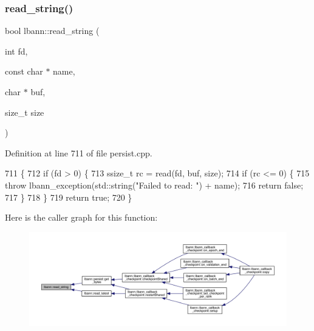 \mbox{\label{namespacelbann_a784843ebce0e596dba31c1d981a7f087}} 
\subsubsection{\texorpdfstring{read\+\_\+string()}{read\_string()}}
{\footnotesize\ttfamily bool lbann\+::read\+\_\+string (\begin{DoxyParamCaption}\item[{int}]{fd,  }\item[{const char $\ast$}]{name,  }\item[{char $\ast$}]{buf,  }\item[{size\+\_\+t}]{size }\end{DoxyParamCaption})}



Definition at line 711 of file persist.\+cpp.


\begin{DoxyCode}
711                                                                         \{
712   \textcolor{keywordflow}{if} (fd > 0) \{
713     ssize\_t rc = read(fd, buf, size);
714     \textcolor{keywordflow}{if} (rc <= 0) \{
715       \textcolor{keywordflow}{throw} lbann\_exception(std::string(\textcolor{stringliteral}{"Failed to read: "}) + name);
716       \textcolor{keywordflow}{return} \textcolor{keyword}{false};
717     \}
718   \}
719   \textcolor{keywordflow}{return} \textcolor{keyword}{true};
720 \}
\end{DoxyCode}
Here is the caller graph for this function\+:\nopagebreak
\begin{figure}[H]
\begin{center}
\leavevmode
\includegraphics[width=350pt]{namespacelbann_a784843ebce0e596dba31c1d981a7f087_icgraph}
\end{center}
\end{figure}
\mbox{\label{namespacelbann_aedcde4d93c4feb5090c927de1c45b90d}} 
